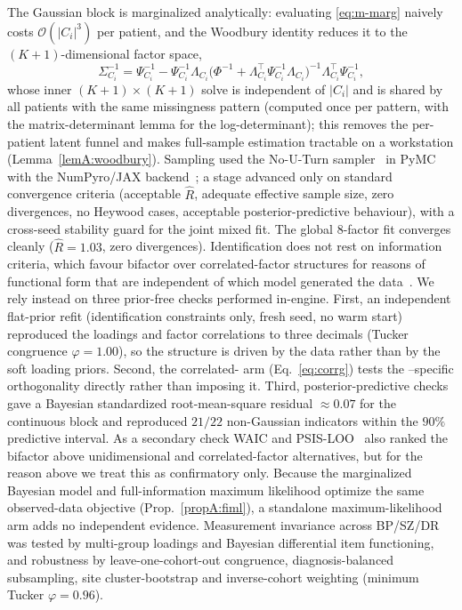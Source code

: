The Gaussian block is marginalized analytically: evaluating \eqref{eq:m-marg} naively costs
$\mathcal{O}(|C_i|^3)$ per patient, and the Woodbury identity reduces it to the
$(K{+}1)$-dimensional factor space,
\begin{equation}
  \Sigma_{C_i}^{-1}=\Psi_{C_i}^{-1}-\Psi_{C_i}^{-1}\Lambda_{C_i}
  \big(\Phi^{-1}+\Lambda_{C_i}^{\top}\Psi_{C_i}^{-1}\Lambda_{C_i}\big)^{-1}
  \Lambda_{C_i}^{\top}\Psi_{C_i}^{-1},
  \label{eq:m-woodbury}
\end{equation}
whose inner $(K{+}1)\times(K{+}1)$ solve is independent of $|C_i|$ and is shared by all
patients with the same missingness pattern (computed once per pattern, with the
matrix-determinant lemma for the log-determinant); this removes the per-patient latent funnel
and makes full-sample estimation tractable on a workstation (Lemma~\ref{lemA:woodbury}).
Sampling used the No-U-Turn sampler~\citep{hoffman2014nuts}
in PyMC~\citep{abrilpla2023pymc} with the NumPyro/JAX backend~\citep{phan2019numpyro};
a stage advanced only on standard convergence criteria (acceptable $\hat R$, adequate
effective sample size, zero divergences, no Heywood cases, acceptable
posterior-predictive behaviour), with a cross-seed stability guard for the joint mixed
fit. The global $8$-factor fit converges cleanly ($\hat R=1.03$, zero divergences). Identification does not rest on information criteria, which favour bifactor over correlated-factor
structures for reasons of functional form that are independent of which model generated the
data~\citep{bonifaycai2017,greene2019fit,bonifay2017three}. We rely instead on three prior-free checks
performed in-engine. First, an independent flat-prior refit (identification constraints only, fresh seed, no
warm start) reproduced the loadings and factor correlations to three decimals (Tucker congruence
$\varphi=1.00$), so the structure is driven by the data rather than by the soft loading priors. Second, the
correlated-\Gfac{} arm (Eq.~\ref{eq:corrg}) tests the \Gfac{}--specific orthogonality directly rather than
imposing it. Third, posterior-predictive checks gave a Bayesian standardized root-mean-square residual
$\approx0.07$ for the continuous block and reproduced $21/22$ non-Gaussian indicators within the $90\%$
predictive interval. As a secondary check WAIC and PSIS-LOO~\citep{watanabe2010waic,vehtari2017loo} also
ranked the bifactor above unidimensional and correlated-factor alternatives, but for the reason above we
treat this as confirmatory only. Because the marginalized Bayesian model and full-information maximum
likelihood optimize the same observed-data objective (Prop.~\ref{propA:fiml}), a standalone
maximum-likelihood arm adds no independent evidence. Measurement invariance across BP/SZ/DR was tested by multi-group loadings and
Bayesian differential item functioning, and robustness by leave-one-cohort-out
congruence, diagnosis-balanced subsampling, site cluster-bootstrap and inverse-cohort
weighting (minimum Tucker $\varphi=0.96$).

